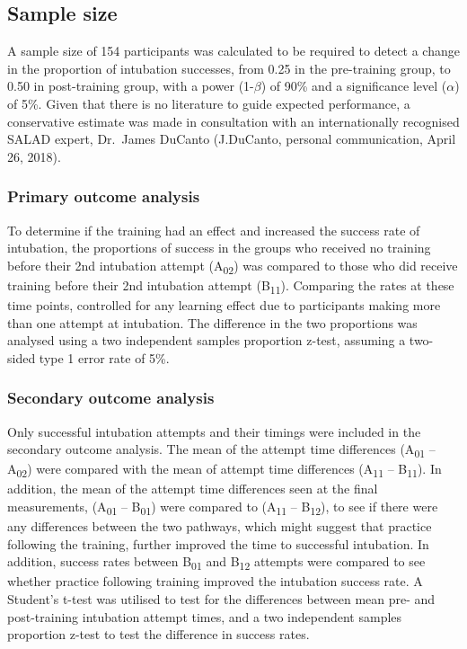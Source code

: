 \documentclass[]{article}
\begin{document}
\hypertarget{sample-size}{%
\subsection{Sample size}\label{sample-size}}

A sample size of 154 participants was calculated to be required to
detect a change in the proportion of intubation successes, from 0.25 in
the pre-training group, to 0.50 in post-training group, with a power
(1-\(\beta\)) of 90\% and a significance level (\(\alpha\)) of 5\%.
Given that there is no literature to guide expected performance, a
conservative estimate was made in consultation with an internationally
recognised SALAD expert, Dr.~James DuCanto (J.DuCanto, personal
communication, April 26, 2018).

\hypertarget{primary-outcome-analysis}{%
\subsubsection{Primary outcome
analysis}\label{primary-outcome-analysis}}

To determine if the training had an effect and increased the success
rate of intubation, the proportions of success in the groups who
received no training before their 2nd intubation attempt
(A\textsubscript{02}) was compared to those who did receive training
before their 2nd intubation attempt (B\textsubscript{11}). Comparing the
rates at these time points, controlled for any learning effect due to
participants making more than one attempt at intubation. The difference
in the two proportions was analysed using a two independent samples
proportion z-test, assuming a two-sided type 1 error rate of 5\%.

\hypertarget{secondary-outcome-analysis}{%
\subsubsection{Secondary outcome
analysis}\label{secondary-outcome-analysis}}

Only successful intubation attempts and their timings were included in
the secondary outcome analysis. The mean of the attempt time differences
(A\textsubscript{01} -- A\textsubscript{02}) were compared with the mean
of attempt time differences (A\textsubscript{11} --
B\textsubscript{11}). In addition, the mean of the attempt time
differences seen at the final measurements, (A\textsubscript{01} --
B\textsubscript{01}) were compared to (A\textsubscript{11} --
B\textsubscript{12}), to see if there were any differences between the
two pathways, which might suggest that practice following the training,
further improved the time to successful intubation. In addition, success
rates between B\textsubscript{01} and B\textsubscript{12} attempts were
compared to see whether practice following training improved the
intubation success rate. A Student's t-test was utilised to test for the
differences between mean pre- and post-training intubation attempt
times, and a two independent samples proportion z-test to test the
difference in success rates.
\end{document}
